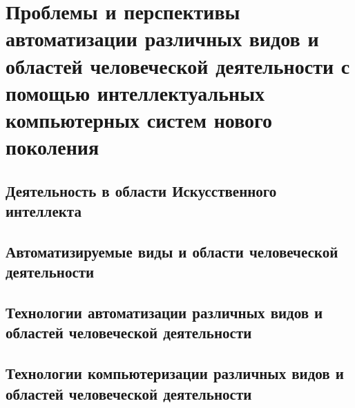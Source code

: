 \chapter{Проблемы и перспективы автоматизации различных видов и областей человеческой деятельности с помощью интеллектуальных компьютерных систем нового поколения}
\label{chapter_automation_perspectives}


\section{Деятельность в области Искусственного интеллекта}
\section{Автоматизируемые виды и области человеческой деятельности}
\section{Технологии автоматизации различных видов и областей человеческой деятельности}
\section{Технологии компьютеризации различных видов и областей человеческой деятельности}

%